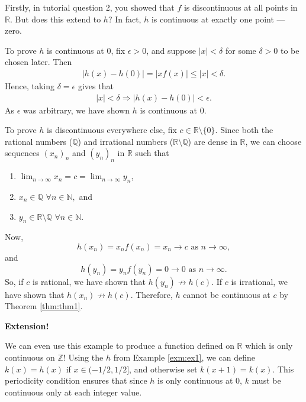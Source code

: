 \documentclass[
  17pt,
  a4paper]{extarticle}
\providecommand{\tightlist}{%
  \setlength{\itemsep}{0pt}\setlength{\parskip}{0pt}}
\theoremstyle{plain}
\theoremstyle{definition}
\theoremstyle{plain}
\theoremstyle{plain}
\theoremstyle{plain}
\theoremstyle{plain}
\theoremstyle{definition}
\theoremstyle{definition}
\theoremstyle{remark}
\theoremstyle{remark}
\let\BeginKnitrBlock\begin \let\EndKnitrBlock\end
\renewcommand{\;}{\,}
\begin{document}
\BeginKnitrBlock{solution*}
Firstly, in tutorial question 2, you showed that \(f\) is discontinuous at all points in \(\mathbb{R}\). But does this extend to \(h\)? In fact, \(h\) is continuous at exactly one point --- zero.

To prove \(h\) is continuous at \(0\), fix \(\epsilon > 0\), and suppose \(\lvert x \rvert < \delta\) for some \(\delta > 0\) to be chosen later. Then
\begin{align*}
\lvert h(x) - h(0) \rvert = \lvert x f(x) \rvert \leq \lvert x \rvert < \delta.
\end{align*}
Hence, taking \(\delta = \epsilon\) gives that
\begin{align*}
\lvert x \rvert < \delta \Longrightarrow \lvert h(x) - h(0) \rvert < \epsilon.
\end{align*}
As \(\epsilon\) was arbitrary, we have shown \(h\) is continuous at \(0\).

To prove \(h\) is discontinuous everywhere else, fix \(c \in \mathbb{R}\setminus \lbrace 0 \rbrace.\) Since both the rational numbers (\(\mathbb{Q}\)) and irrational numbers (\(\mathbb{R}\setminus\mathbb{Q}\)) are dense in \(\mathbb{R}\), we can choose sequences \((x_n)_n\) and \((y_n)_n\) in \(\mathbb{R}\) such that

\begin{enumerate}
\def\labelenumi{\arabic{enumi}.}
\tightlist
\item
  \(\lim_{n \to \infty} x_n = c = \lim_{n \to \infty} y_n\),
\item
  \(x_n \in \mathbb{Q}\;\;\forall n \in \mathbb{N},\) and
\item
  \(y_n \in \mathbb{R}\setminus\mathbb{Q}\;\;\forall n \in \mathbb{N}.\)
\end{enumerate}

Now, \[h(x_n) = x_n f(x_n) = x_n \to c \;\;\text{as}\;\; n \to \infty,\] and \[h(y_n) = y_n f(y_n) = 0 \to 0 \;\;\text{as}\;\; n \to \infty.\] So, if \(c\) is rational, we have shown that \(h(y_n)\not\to h(c)\). If \(c\) is irrational, we have shown that \(h(x_n)\not\to h(c)\). Therefore, \(h\) cannot be continuous at \(c\) by Theorem \ref{thm:thm1}.
\EndKnitrBlock{solution*}

\textbf{Extension!}

\BeginKnitrBlock{example}
{\label{exm:ex2} }We can even use this example to produce a function defined on \(\mathbb{R}\) which is only continuous on \(\mathbb{Z}\)! Using the \(h\) from Example \ref{exm:ex1}, we can define \(k(x) = h(x)\) if \(x \in (-1/2, 1/2]\), and otherwise set \(k(x + 1) = k(x).\) This periodicity condition ensures that since \(h\) is only continuous at \(0\), \(k\) must be continuous only at each integer value.
\EndKnitrBlock{example}
\end{document}
